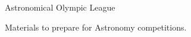 \entryItem
	{Astronomical Olympic League}
	{}

	\begin{items}
		\item Materials to prepare for Astronomy competitions.
	\end{items}
